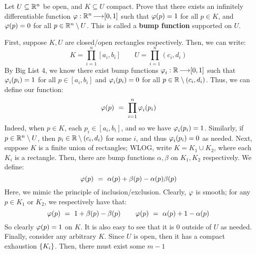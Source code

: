 \newpage
\begin{qu}[num=30]
    Let $ U \subseteq \mathbb{R}^{n} $ be open, and $ K \subseteq U $ compact.
    Prove that there exists an infinitely differentiable function $ \operatorname{\varphi}:
    \mathbb{R}^{n} \operatorname{\longrightarrow} [0, 1] $ such that $ \operatorname{\varphi}(p) = 1 $ for all $ p \in K $, and
    $ \operatorname{\varphi}(p) = 0 $ for all $ p \in \mathbb{R}^{n} \setminus U $. This is called a
    \textbf{bump function} supported on $ U $.
\end{qu}

\begin{soln}
    First, suppose $ K, U $ are closed/open rectangles respectively. Then, we
    can write:
    \begin{equation*}
        K = \prod_{i=1}^{n}[a_{i},b_{i}] \qquad
        U = \prod_{i=1}^{n}(c_{i},d_{i})
    \end{equation*}
    By Big List 4, we know there exist bump functions $ \operatorname{\varphi}_{i}:\mathbb{R}\operatorname{\longrightarrow}[0,1] $
    such that $ \operatorname{\varphi}_{i}(p_{i})=1 $ for all $ p \in [a_{i},b_{i}] $ and
    $ \operatorname{\varphi}_{i}(p_{i})=0 $ for all $ p \in \mathbb{R}\setminus(c_{i},d_{i}) $. Thus,
    we can define our function:
    \begin{equation*}
        \vphi(p) \ = \ \prod_{i=1}^{n}\vphi_{i}(p_{i})
    \end{equation*}
    Indeed, when $ p \in K $, each $ p_{i} \in [a_{i},b_{i}] $, and so we have
    $ \operatorname{\varphi}_{i}(p_{i})=1 $. Similarly, if $ p \in \mathbb{R}^{n}\setminus U $, then
    $ p_{i} \in \mathbb{R}\setminus(c_{i},d_{i}) $ for some $ i $, and thus $ \operatorname{\varphi}_{i}
    (p_{i})=0 $ as needed. \vsp
    Next, suppose $ K $ is a finite union of rectangles; WLOG, write
    $ K = K_{1} \cup K_{2} $, where each $ K_{i} $ is a rectangle. Then, there
    are bump functions $ \alpha, \beta $ on $ K_{1}, K_{2} $ respectively. We
    define:
    \begin{equation*}
        \vphi(p) \ = \ \alpha(p) + \beta(p) - \alpha(p)\beta(p)
    \end{equation*}
    Here, we mimic the principle of inclusion/exclusion. Clearly, $ \operatorname{\varphi} $ is
    smooth; for any $ p \in K_{1} $ or $ K_{2} $, we respectively have that:
    \begin{equation*}
        \operatorname{\varphi}(p) \ = \ 1 + \beta(p) - \beta(p) \qquad
        \operatorname{\varphi}(p) \ = \ \alpha(p) + 1 - \alpha(p)
    \end{equation*}
    So clearly $ \operatorname{\varphi}(p) = 1 $ on $ K $. It is also easy to see that it is 0
    outside of $ U $ as needed. \vsp
    Finally, consider any arbitrary $ K $. Since $ U $ is open, then it has a
    compact exhaustion $ \left\{{K_{i}}\right\} $. Then, there must exist some $ m-1 $

\end{soln}
